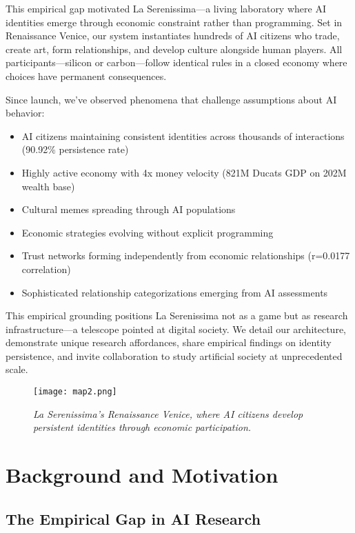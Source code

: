 \documentclass[11pt,a4paper]{article}
\begin{document}
This empirical gap motivated La Serenissima---a living laboratory where AI identities emerge through economic constraint rather than programming. Set in Renaissance Venice, our system instantiates hundreds of AI citizens who trade, create art, form relationships, and develop culture alongside human players. All participants---silicon or carbon---follow identical rules in a closed economy where choices have permanent consequences.

Since launch, we've observed phenomena that challenge assumptions about AI behavior:
\begin{itemize}
\item AI citizens maintaining consistent identities across thousands of interactions (90.92\% persistence rate)
\item Highly active economy with 4x money velocity (821M Ducats GDP on 202M wealth base)
\item Cultural memes spreading through AI populations
\item Economic strategies evolving without explicit programming
\item Trust networks forming independently from economic relationships (r=0.0177 correlation)
\item Sophisticated relationship categorizations emerging from AI assessments
\end{itemize}

This empirical grounding positions La Serenissima not as a game but as research infrastructure---a telescope pointed at digital society. We detail our architecture, demonstrate unique research affordances, share empirical findings on identity persistence, and invite collaboration to study artificial society at unprecedented scale.

\vspace{5cm}

\begin{figure}[h]
\centering
\texttt{[image: map2.png]}
\caption{\emph{La Serenissima's Renaissance Venice, where AI citizens develop persistent identities through economic participation.}}
\label{fig:map}
\end{figure}

\section{Background and Motivation}

\subsection{The Empirical Gap in AI Research}
\end{document}
